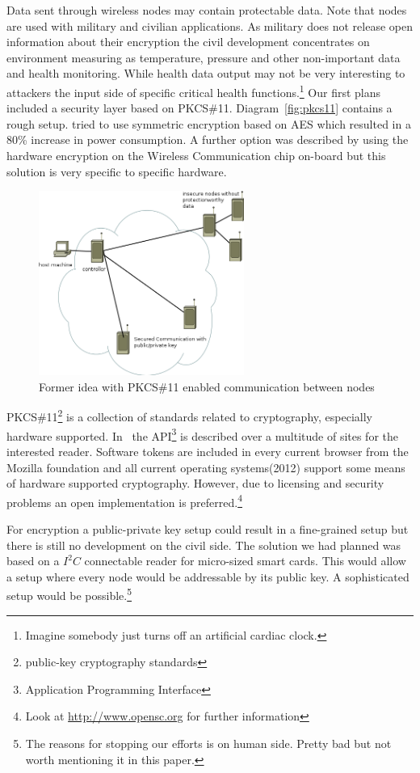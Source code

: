 Data sent through wireless nodes may contain protectable data. Note that nodes are used with military and civilian applications. As military does
not release open information about their encryption the civil development concentrates on environment measuring as temperature, pressure and other 
non-important data and health monitoring.\cite{Dispert}
While health data output may not be very interesting to attackers the input side of specific critical health functions.\footnote{Imagine somebody 
just turns off an artificial cardiac clock.}
Our first plans included a security layer based on \textsc{PKCS\#11}. Diagram~\ref{fig:pkcs11} contains a rough setup. \cite{wsnsec} tried to 
use symmetric encryption based on \textsc{AES} which resulted in a 80\% increase in power consumption. A further option was described by 
using the hardware encryption on the Wireless Communication chip on-board but this solution is very specific to specific hardware.

\begin{figure}[h]
   \centering
   \includegraphics[width=0.6\textwidth]{pic/pkcs11.png}%
   \caption{Former idea with PKCS\#11 enabled communication between nodes}
   \label{pkcs11}%
\end{figure}


\textsc{PKCS\#11}\footnote{public-key cryptography standards} is a collection of standards related to cryptography, especially hardware supported.
In~\cite{PKCS_RSA} the API\footnote{Application Programming Interface} is described over a multitude of sites for the interested reader.
Software tokens are included in every current browser from the Mozilla foundation and all current operating systems(2012) support some means of 
hardware supported cryptography. However, due to licensing and security problems an open implementation is preferred.\footnote{Look at \url{http://www.opensc.org} for further information}

For encryption a public-private key setup could result in a fine-grained setup but there is still no development on the civil side.
The solution we had planned was based on a \(I^2C\) connectable reader for micro-sized smart cards. This would allow a setup where every node
would be addressable by its public key. A sophisticated setup would be possible.\footnote{The reasons for stopping our efforts is on human side. Pretty
bad but not worth mentioning it in this paper.}
